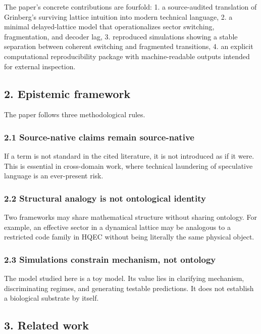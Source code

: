 \documentclass[
]{article}
\begin{document}
The paper's concrete contributions are fourfold: 1. a source-audited
translation of Grinberg's surviving lattice intuition into modern
technical language, 2. a minimal delayed-lattice model that
operationalizes sector switching, fragmentation, and decoder lag, 3.
reproduced simulations showing a stable separation between coherent
switching and fragmented transitions, 4. an explicit computational
reproducibility package with machine-readable outputs intended for
external inspection.

\subsection{2. Epistemic framework}\label{epistemic-framework}

The paper follows three methodological rules.

\subsubsection{2.1 Source-native claims remain
source-native}\label{source-native-claims-remain-source-native}

If a term is not standard in the cited literature, it is not introduced
as if it were. This is essential in cross-domain work, where technical
laundering of speculative language is an ever-present risk.

\subsubsection{2.2 Structural analogy is not ontological
identity}\label{structural-analogy-is-not-ontological-identity}

Two frameworks may share mathematical structure without sharing
ontology. For example, an effective sector in a dynamical lattice may be
analogous to a restricted code family in HQEC without being literally
the same physical object.

\subsubsection{2.3 Simulations constrain mechanism, not
ontology}\label{simulations-constrain-mechanism-not-ontology}

The model studied here is a toy model. Its value lies in clarifying
mechanism, discriminating regimes, and generating testable predictions.
It does not establish a biological substrate by itself.

\subsection{3. Related work}\label{related-work}
\end{document}
